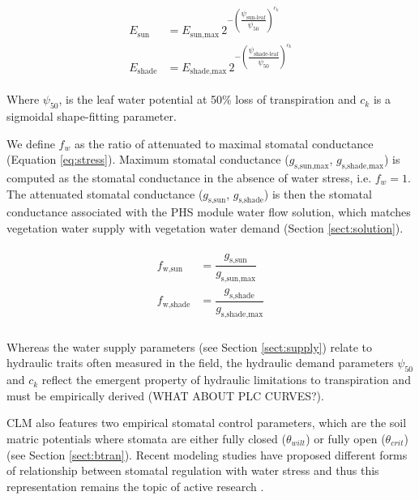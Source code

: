 \documentclass[draft,linenumbers]{agujournal}
\begin{document}
    
     \begin{linenomath*}
     \begin{eqnarray}
     \begin{aligned}
     \label{eq:demand}
     E_{\text{sun}}     &= E_{\text{sun,max}} \, 2^{-\left(\dfrac{\psi_{\text{sun-leaf}}}{\psi_{50}}\right)^{c_k}} \\
     E_{\text{shade}} &= E_{\text{shade,max}} \, 2^{-\left(\dfrac{\psi_{\text{shade-leaf}}}{\psi_{50}}\right)^{c_k}}
     \end{aligned}
     \end{eqnarray}
     \end{linenomath*}
    
     Where $\psi_{50}$, is the leaf water potential at 50\% loss of transpiration and $c_k$ is a sigmoidal shape-fitting parameter.

    
    We define $f_w$ as the ratio of attenuated to maximal stomatal conductance (Equation \ref{eq:stress}).  Maximum stomatal conductance ($g_{\text{s,sun,max}}$, $g_{\text{s,shade,max}}$) is computed as the stomatal conductance in the absence of water stress, i.e. $f_w=1$.  The attenuated stomatal conductance ($g_{\text{s,sun}}$, $g_{\text{s,shade}}$) is then the stomatal conductance associated with the PHS module water flow solution, which matches vegetation water supply with vegetation water demand 
    (Section \ref{sect:solution}).
    
     \begin{linenomath*}
     \begin{eqnarray}
     \begin{aligned}
     \label{eq:stress}
     f_{\text{w,sun}}         &= \dfrac{g_{\text{s,sun}}}{g_{\text{s,sun,max}}} \\
     f_{\text{w,shade}}     &= \dfrac{g_{\text{s,shade}}}{g_{\text{s,shade,max}}} \\
     \end{aligned}
     \end{eqnarray}
     \end{linenomath*}
    
     Whereas the water supply parameters (see Section \ref{sect:supply}) relate to hydraulic traits often measured in the field, the hydraulic demand parameters $\psi_{50}$ and $c_k$ reflect the emergent property of hydraulic limitations to transpiration and must be empirically derived (WHAT ABOUT PLC CURVES?).
     
     CLM also features two empirical stomatal control parameters, which are the soil matric potentials where stomata are either fully closed ($\theta_{wilt}$) or fully open  ($\theta_{crit}$)  (see Section \ref{sect:btran}). Recent modeling studies have proposed different forms of relationship between stomatal regulation with water stress \citep{sperry2017,xu2016,christoffersen2016} and thus this representation remains the topic of active research . 
\end{document}
